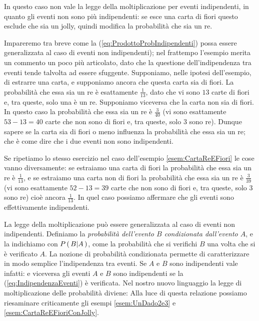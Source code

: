 \begin{exemplify}
{In questo caso non vale la legge della moltiplicazione per eventi
indipendenti, in quanto gli eventi non sono pi\`u indipendenti:
se esce una carta di fiori questo esclude che sia
un jolly, quindi modifica la probabilit\`a che sia un re.

Impareremo tra breve come la (\ref{eq:ProdottoProbIndipendenti}) possa
essere generalizzata al caso di eventi non indipendenti); nel frattempo
l'esempio merita un commento un poco pi\`u articolato, dato che
la questione dell'indipendenza tra eventi tende talvolta ad essere
sfuggente.
Supponiamo, nelle ipotesi dell'esempio, di estrarre una carta, e supponiamo
ancora che questa carta sia di fiori. La probabilit\`a che essa sia
un re \`e esattamente $\frac{1}{13}$, dato che vi sono $13$ carte di fiori e,
tra queste, solo una \`e un re. Supponiamo viceversa che la carta non sia
di fiori. In questo caso la probabilit\`a che essa sia un re \`e $\frac{3}{40}$
(vi sono esattamente $53 - 13 = 40$ carte che non sono di fiori e, tra queste,
solo $3$ sono re).
Dunque sapere se la carta sia di fiori o meno influenza la probabilit\`a
che essa sia un re; che \`e come dire che i due eventi non sono
indipendenti.

Se ripetiamo lo stesso esercizio nel caso dell'esempio \ref{esem:CartaReEFiori}
le cose vanno diversamente: se estraiamo una carta di fiori la probabilit\`a
che essa sia un re \`e $\frac{1}{13}$, e se estraiamo una carta non di
fiori la probabilit\`a che essa sia un re \`e $\frac{3}{39}$
(vi sono esattamente $52 - 13 = 39$ carte che non sono di fiori e, tra queste,
solo $3$ sono re) cio\`e ancora $\frac{1}{13}$. In quel caso possiamo
affermare che gli eventi sono effettivamente indipendenti.
}

\end{exemplify}

\noindent La legge della moltiplicazione pu\`o essere generalizzata al caso
di eventi non indipendenti.
Definiamo la \emph{probabilit\`a dell'evento $B$ condizionata dall'evento
$A$}, e la indichiamo con $\displaystyle P\left(\, B|A \, \right)$, come la probabilit\`a che si verifichi
$B$ una volta che si \`e verificato $A$. La nozione di probabilit\`a
condizionata permette di caratterizzare in modo semplice l'indipendenza
tra eventi. Se $A$ e $B$ sono indipendenti vale infatti:
e viceversa gli eventi $A$ e $B$ sono indipendenti se la
(\ref{eq:IndipendenzaEventi}) \`e verificata.
Nel nostro nuovo linguaggio la legge di moltiplicazione delle probabilit\`a
diviene:
Alla luce di questa relazione possiamo riesaminare criticamente gli esempi
\ref{esem:UnDado2e3} e \ref{esem:CartaReEFioriConJolly}.

